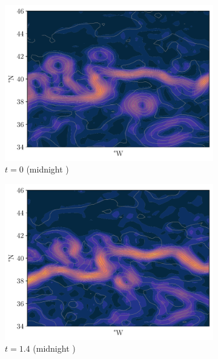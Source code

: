 \begin{figure}
	\begin{center}
		\begin{subfigure}{0.49\textwidth}
			\includegraphics[width=\textwidth]{chp06_applications/figures/gulf_stream_motivation/streamlines_0}
			\caption{\(t = 0\) (midnight )}
		\end{subfigure}
		\begin{subfigure}{0.49\textwidth}
			\includegraphics[width=\textwidth]{chp06_applications/figures/gulf_stream_motivation/streamlines_1.pdf}
			\caption{\(t = 1.4\) (midnight )}
		\end{subfigure}
		\begin{subfigure}{0.49\textwidth}

\end{subfigure}
\end{center}
\end{figure}
